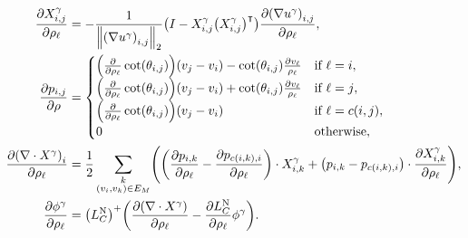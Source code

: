 \begin{align*}
	\frac{\partial X^\gamma_{i, j}}{\partial \rho_\ell} &= -\frac{1}{\norm{\pof{\nabla u^\gamma}_{i, j}}_2}\pof{I - X^\gamma_{i, j}\pof{X^\gamma_{i, j}}^\intercal}\frac{\partial \pof{\nabla u^\gamma}_{i, j}}{\partial \rho_\ell}, \\
	\frac{\partial p_{i, j}}{\partial \rho} &= \begin{cases}
		\pof{\frac{\partial}{\partial \rho_\ell}\cot\pof{\theta_{i, j}}}\pof{v_j - v_i} - \cot\pof{\theta_{i, j}}\frac{\partial v_\ell}{\rho_\ell} & \text{if \(\ell = i\)}, \\
		\pof{\frac{\partial}{\partial \rho_\ell}\cot\pof{\theta_{i, j}}}\pof{v_j - v_i} + \cot\pof{\theta_{i, j}}\frac{\partial v_\ell}{\rho_\ell} & \text{if \(\ell = j\)}, \\
		\pof{\frac{\partial}{\partial \rho_\ell}\cot\pof{\theta_{i, j}}}\pof{v_j - v_i} & \text{if \(\ell = c\pof{i, j}\)}, \\
		0 & \text{otherwise},
	\end{cases} \\
	\frac{\partial \pof{\nabla \cdot X^\gamma}_i}{\partial \rho_\ell} &= \frac{1}{2}\sum_{\substack{k \\ \pof{v_i, v_k} \in E_M}}\pof{\pof{\frac{\partial p_{i, k}}{\partial \rho_\ell} - \frac{\partial p_{c\pof{i, k}, i}}{\partial \rho_\ell}} \cdot X^\gamma_{i, k} + \pof{p_{i, k} - p_{c\pof{i, k}, i}} \cdot \frac{\partial X^\gamma_{i, k}}{\partial \rho_\ell}}, \\
	\frac{\partial \phi^\gamma}{\partial \rho_\ell} &= \pof{L_C^{\text{N}}}^+\pof{\frac{\partial \pof{\nabla \cdot X^\gamma}}{\partial \rho_\ell} - \frac{\partial L_C^{\text{N}}}{\partial \rho_\ell}\phi^\gamma}.
\end{align*}
